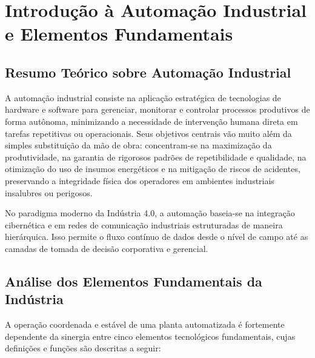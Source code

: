 \documentclass[12pt]{article}
\begin{document}
\section{Introdução à Automação Industrial e Elementos Fundamentais}

\subsection{Resumo Teórico sobre Automação Industrial}
A automação industrial consiste na aplicação estratégica de tecnologias de hardware e software para gerenciar, monitorar e controlar processos produtivos de forma autônoma, minimizando a necessidade de intervenção humana direta em tarefas repetitivas ou operacionais. Seus objetivos centrais vão muito além da simples substituição da mão de obra: concentram-se na maximização da produtividade, na garantia de rigorosos padrões de repetibilidade e qualidade, na otimização do uso de insumos energéticos e na mitigação de riscos de acidentes, preservando a integridade física dos operadores em ambientes industriais insalubres ou perigosos.

No paradigma moderno da Indústria 4.0, a automação baseia-se na integração cibernética e em redes de comunicação industriais estruturadas de maneira hierárquica. Isso permite o fluxo contínuo de dados desde o nível de campo até as camadas de tomada de decisão corporativa e gerencial.

\subsection{Análise dos Elementos Fundamentais da Indústria}
A operação coordenada e estável de uma planta automatizada é fortemente dependente da sinergia entre cinco elementos tecnológicos fundamentais, cujas definições e funções são descritas a seguir:
\end{document}

